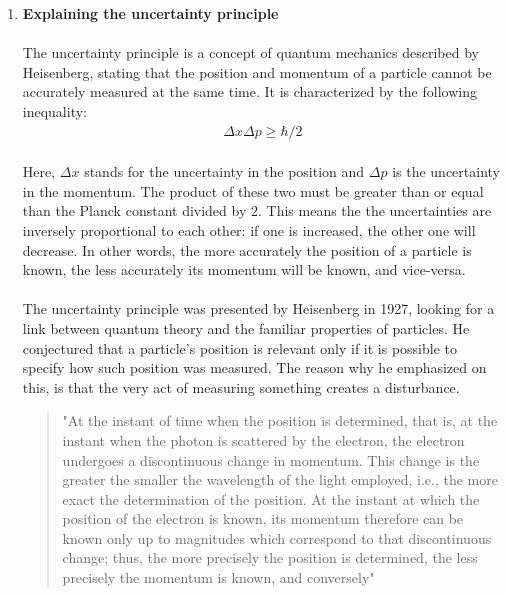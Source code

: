 \documentclass[letter]{article}
\begin{document}
\begin{enumerate}

    \item  \textbf{Explaining the uncertainty principle}

    \paragraph{}The uncertainty principle is a concept of quantum mechanics described by Heisenberg, stating that the position and momentum of a particle cannot be accurately measured at the same time. It is characterized by the following inequality:
    \begin{equation}
        \begin{split}
            \Delta x \Delta p\ge \hbar / 2
        \end{split}
    \end{equation}
    \paragraph{}Here, $\Delta x$ stands for the uncertainty in the position and $\Delta p$ is the uncertainty in the momentum. The product of these two must be greater than or equal than the Planck constant divided by $2$. This means the the uncertainties are inversely proportional to each other: if one is increased, the other one will decrease. In other words, the more accurately the position of a particle is known, the less accurately its momentum will be known, and vice-versa.
     \paragraph{} The uncertainty principle was presented by Heisenberg in 1927, looking for a link between quantum theory and the familiar properties of particles. He conjectured that a particle's position is relevant only if it is possible to specify how such position was measured. The reason why he emphasized on this, is that the very act of measuring something creates a disturbance.
     \blockquote{"At the instant of time when the position is determined, that is, at the instant when the photon is scattered by the electron, the electron undergoes a discontinuous change in momentum. This change is the greater the smaller the wavelength of the light employed, i.e., the more exact the determination of the position. At the instant at which the position of the electron is known, its momentum therefore can be known only up to magnitudes which correspond to that discontinuous change; thus, the more precisely the position is determined, the less precisely the momentum is known, and conversely" \cite{Heisenberg, W. (1927)}} 

\end{enumerate}
\end{document}
